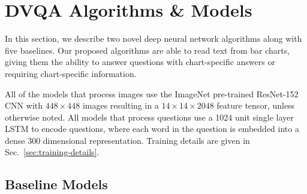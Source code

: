 \documentclass[10pt,twocolumn,letterpaper]{article}
\begin{document}
\section{DVQA Algorithms \& Models}

In this section, we describe two novel deep neural network algorithms along with five baselines. Our proposed algorithms are able to read text from bar charts, giving them the ability to answer questions with chart-specific answers or requiring chart-specific information. 

All of the models that process images use the ImageNet pre-trained ResNet-152~\cite{resnet} CNN with $448 \times 448$ images resulting in a $14 \times 14 \times 2048$ feature tensor, unless otherwise noted. All models that process questions use a 1024 unit single layer LSTM to encode questions, where each word in the question is embedded into a dense 300 dimensional representation. Training details are given in Sec.~\ref{sec:training-details}.

\subsection{Baseline Models}
\label{sec:baseline}
\end{document}
